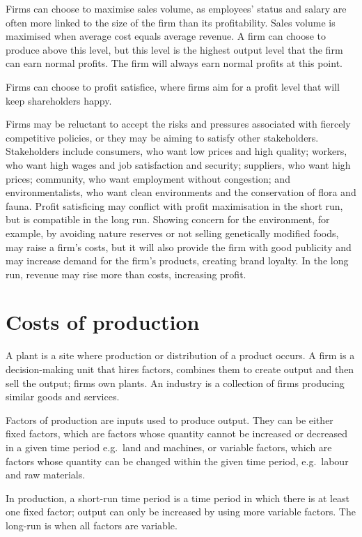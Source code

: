 \documentclass[Economics.tex]{subfiles}
\begin{document}
Firms can choose to maximise sales volume, as employees' status and salary are often more linked to the size of the firm than its profitability. Sales volume is maximised when average cost equals average revenue. A firm can choose to produce above this level, but this level is the highest output level that the firm can earn normal profits. The firm will always earn normal profits at this point.

Firms can choose to profit satisfice, where firms aim for a profit level that will keep shareholders happy.

Firms may be reluctant to accept the risks and pressures associated with fiercely competitive policies, or they may be aiming to satisfy other stakeholders. Stakeholders include consumers, who want low prices and high quality; workers, who want high wages and job satisfaction and security; suppliers, who want high prices; community, who want employment without congestion; and environmentalists, who want clean environments and the conservation of flora and fauna. Profit satisficing may conflict with profit maximisation in the short run, but is compatible in the long run. Showing concern for the environment, for example, by avoiding nature reserves or not selling genetically modified foods, may raise a firm's costs, but it will also provide the firm with good publicity and may increase demand for the firm's products, creating brand loyalty. In the long run, revenue may rise more than costs, increasing profit.
\section{Costs of production}
A plant is a site where production or distribution of a product occurs. A firm is a decision-making unit that hires factors, combines them to create output and then sell the output; firms own plants. An industry is a collection of firms producing similar goods and services.

Factors of production are inputs used to produce output. They can be either fixed factors, which are factors whose quantity cannot be increased or decreased in a given time period e.g.\ land and machines, or variable factors, which are factors whose quantity can be changed within the given time period, e.g.\ labour and raw materials.

In production, a short-run time period is a time period in which there is at least one fixed factor; output can only be increased by using more variable factors. The long-run is when all factors are variable.
\end{document}
